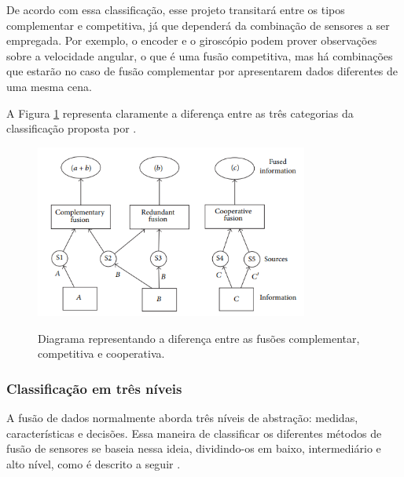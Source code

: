 \documentclass[acronym, symbols, table]{fei}
\begin{document}
				De acordo com essa classificação, esse projeto transitará entre os tipos complementar e competitiva, já que dependerá da combinação de sensores a ser empregada. Por exemplo, o encoder e o giroscópio podem prover observações sobre a velocidade angular, o que é uma fusão competitiva, mas há combinações que estarão no caso de fusão complementar por apresentarem dados diferentes de uma mesma cena.
			
				A Figura \ref{fig:classificacao_fusao_de_sensores} representa claramente a diferença entre as três categorias da classificação proposta por \textcite{castanedo2013review}.
			
				\begin{figure}[!htb]
					\centering
					\caption{Diagrama representando a diferença entre as fusões complementar, competitiva e cooperativa.} 
					\includegraphics[width=0.8\textwidth]{classificacao_fusao_de_sensores.png}
					\label{fig:classificacao_fusao_de_sensores}
				\end{figure}
			
			\subsubsection{Classificação em três níveis}
			
				A fusão de dados normalmente aborda três níveis de abstração: medidas, características e decisões. Essa maneira de classificar os diferentes métodos de fusão de sensores se baseia nessa ideia, dividindo-os em baixo, intermediário e alto nível, como é descrito a seguir \cite{castanedo2013review}.
			
\end{document}
